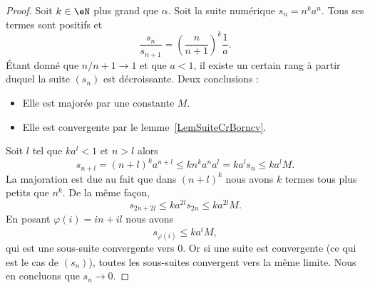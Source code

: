 \begin{proof}
    Soit \( k\in \eN\) plus grand que \( \alpha\).
    Soit la suite numérique \( s_n=n^ka^n\). Tous ses termes sont positifs et
    \begin{equation}
        \frac{ s_n }{ s_{n+1} }=\left( \frac{ n }{ n+1 } \right)^k\frac{1}{ a }.
    \end{equation}
    Étant donné que \( n/n+1\to 1\) et que \( a<1\), il existe un certain rang à partir duquel la suite \( (s_n)\) est décroissante. Deux conclusions :
    \begin{itemize}
        \item Elle est majorée par une constante \( M\).
        \item Elle est convergente par le lemme~\ref{LemSuiteCrBorncv}.
    \end{itemize}
    Soit \( l\) tel que \( ka^l<1\) et \( n>l\) alors
    \begin{equation}
        s_{n+l}=(n+l)^ka^{n+l}\leq kn^ka^na^l=ka^ls_n\leq ka^lM.
    \end{equation}
    La majoration est due au fait que dans \( (n+l)^k\) nous avons \( k\) termes tous plus petits que \( n^k\). De la même façon,
    \begin{equation}
        s_{2n+2l}\leq ka^{2l}s_{2n}\leq ka^{2l}M.
    \end{equation}
    En posant \( \varphi(i)=in+il\) nous avons
    \begin{equation}
        s_{\varphi(i)}\leq ka^iM,
    \end{equation}
    qui est une sous-suite convergente vers \( 0\). Or si une suite est convergente (ce qui est le cas de \( (s_n)\)), toutes les sous-suites convergent vers la même limite. Nous en concluons que \( s_n\to 0\).
\end{proof}

